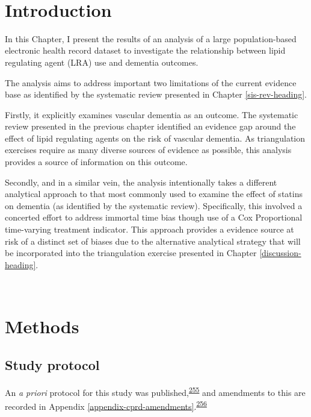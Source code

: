 \documentclass[a4paper, twoside]{templates/ociamthesis}
\begin{document}
~

\hypertarget{introduction-1}{%
\section{Introduction}\label{introduction-1}}

In this Chapter, I present the results of an analysis of a large population-based electronic health record dataset to investigate the relationship between lipid regulating agent (LRA) use and dementia outcomes.

The analysis aims to address important two limitations of the current evidence base as identified by the systematic review presented in Chapter \ref{sis-rev-heading}.

Firstly, it explicitly examines vascular dementia as an outcome. The systematic review presented in the previous chapter identified an evidence gap around the effect of lipid regulating agents on the risk of vascular dementia. As triangulation exercises require as many diverse sources of evidence as possible, this analysis provides a source of information on this outcome.

Secondly, and in a similar vein, the analysis intentionally takes a different analytical approach to that most commonly used to examine the effect of statins on dementia (as identified by the systematic review). Specifically, this involved a concerted effort to address immortal time bias though use of a Cox Proportional time-varying treatment indicator. This approach provides a evidence source at risk of a distinct set of biases due to the alternative analytical strategy that will be incorporated into the triangulation exercise presented in Chapter \ref{discussion-heading}.

~

\hypertarget{methods-1}{%
\section{Methods}\label{methods-1}}

\hypertarget{study-protocol}{%
\subsection{Study protocol}\label{study-protocol}}

An \emph{a priori} protocol for this study was published,\textsuperscript{\protect\hyperlink{ref-walker2016}{255}} and amendments to this are recorded in Appendix \ref{appendix-cprd-amendments}.\textsuperscript{\protect\hyperlink{ref-vonelm2008}{256}}
\end{document}
